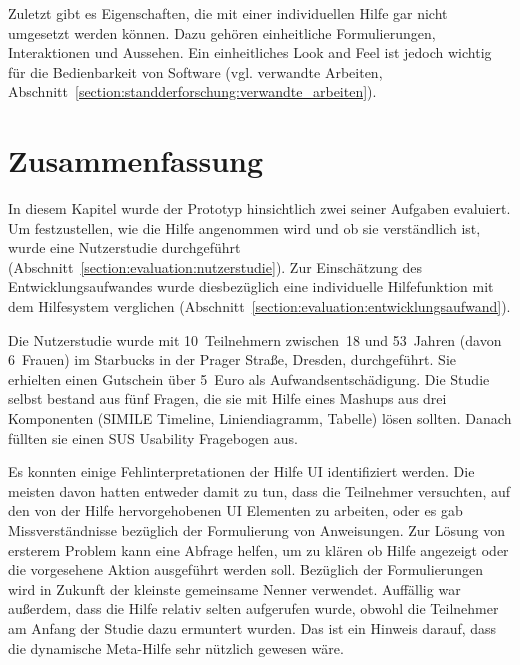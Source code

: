 \documentclass[
	headsepline,
	footsepline,
	fontsize=12pt,
	bibliography=totoc
]{scrbook}
\begin{document}
Zuletzt gibt es Eigenschaften, die mit einer individuellen Hilfe gar nicht umgesetzt werden können. Dazu gehören einheitliche Formulierungen, Interaktionen und Aussehen. Ein einheitliches Look and Feel ist jedoch wichtig für die Bedienbarkeit von Software (vgl. verwandte Arbeiten, Abschnitt~\ref{section:standderforschung:verwandte_arbeiten}).

\section{Zusammenfassung}

In diesem Kapitel wurde der Prototyp hinsichtlich zwei seiner Aufgaben evaluiert. Um festzustellen, wie die Hilfe angenommen wird und ob sie verständlich ist, wurde eine Nutzerstudie durchgeführt (Abschnitt~\ref{section:evaluation:nutzerstudie}). Zur Einschätzung des Entwicklungsaufwandes wurde diesbezüglich eine individuelle Hilfefunktion mit dem Hilfesystem verglichen (Abschnitt~\ref{section:evaluation:entwicklungsaufwand}).


Die Nutzerstudie wurde mit 10~Teilnehmern zwischen~18 und 53~Jahren (davon 6~Frauen) im Starbucks in der Prager Straße, Dresden, durchgeführt. Sie erhielten einen Gutschein über 5~Euro als Aufwandsentschädigung. Die Studie selbst bestand aus fünf Fragen, die sie mit Hilfe eines Mashups aus drei Komponenten (SIMILE Timeline, Liniendiagramm, Tabelle) lösen sollten. Danach füllten sie einen SUS Usability Fragebogen aus.

Es konnten einige Fehlinterpretationen der Hilfe UI identifiziert werden. Die meisten davon hatten entweder damit zu tun, dass die Teilnehmer versuchten, auf den von der Hilfe hervorgehobenen UI Elementen zu arbeiten, oder es gab Missverständnisse bezüglich der Formulierung von Anweisungen. Zur Lösung von ersterem Problem kann eine Abfrage helfen, um zu klären ob Hilfe angezeigt oder die vorgesehene Aktion ausgeführt werden soll. Bezüglich der Formulierungen wird in Zukunft der kleinste gemeinsame Nenner verwendet. Auffällig war außerdem, dass die Hilfe relativ selten aufgerufen wurde, obwohl die Teilnehmer am Anfang der Studie dazu ermuntert wurden. Das ist ein Hinweis darauf, dass die dynamische Meta-Hilfe sehr nützlich gewesen wäre.
\end{document}
